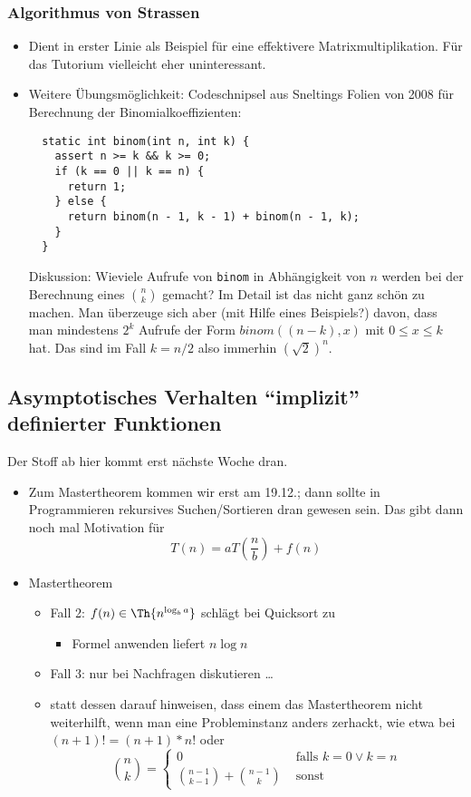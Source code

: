 \documentclass[12pt]{article}
\theoremstyle{margin}
\theoremstyle{margin}
\begin{document}
\subsubsection{Algorithmus von Strassen}

\begin{itemize}
 \item Dient in erster Linie als Beispiel f\"ur eine effektivere Matrixmultiplikation. F\"ur das Tutorium vielleicht eher uninteressant.
 \item 
  Weitere \"Ubungsm\"oglichkeit: Codeschnipsel aus Sneltings Folien von
  2008 f\"ur Berechnung der Binomialkoeffizienten:
\begin{verbatim}
  static int binom(int n, int k) {
    assert n >= k && k >= 0;
    if (k == 0 || k == n) {
      return 1;
    } else {
      return binom(n - 1, k - 1) + binom(n - 1, k);
    }
  }
\end{verbatim}
  Diskussion: Wieviele Aufrufe von \verb|binom| in Abh\"angigkeit von
  $n$ werden bei der Berechnung eines $\binom{n}{k}$ gemacht? Im
  Detail ist das nicht ganz sch\"on zu machen. Man \"uberzeuge sich aber
  (mit Hilfe eines Beispiels?) davon, dass man mindestens $2^k$ Aufrufe
  der Form $binom((n-k),x)$ mit $0\leq x\leq k$ hat. Das sind im Fall
  $k=n/2$ also immerhin $\left(\sqrt{2}\right)^n$.

\end{itemize}

\subsection{Asymptotisches Verhalten "`implizit"' definierter Funktionen}
Der Stoff ab hier kommt erst n\"achste Woche dran.
\begin{itemize}
 \item 
  Zum Mastertheorem kommen wir erst am 19.12.; dann sollte
  in Programmieren rekursives Suchen/Sortieren dran gewesen sein. Das
  gibt dann noch mal Motivation f\"ur
  \[
  T(n) = a T\left(\frac{n}{b}\right) + f(n)
  \]

\item  Mastertheorem
  \begin{itemize}
  \item Fall 2: $f(n) \in \Th{n^{\log_b a}}$ schl\"agt bei Quicksort zu
    \begin{itemize}
    \item Formel anwenden liefert $n\log n$
    \end{itemize}
  \item Fall 3: nur bei Nachfragen diskutieren \dots
  \item statt dessen darauf hinweisen, dass einem das Mastertheorem
    nicht weiterhilft, wenn man eine Probleminstanz anders zerhackt,
    wie etwa bei  $(n+1)!=(n+1)*n!$ oder
    \[
    \binom{n}{k}=\begin{cases}
      0 & \text{ falls } k=0\lor k=n\\
      \binom{n-1}{k-1}+\binom{n-1}{k} & \text{ sonst}
    \end{cases}
    \]
  \end{itemize}

\end{itemize}
\end{document}
